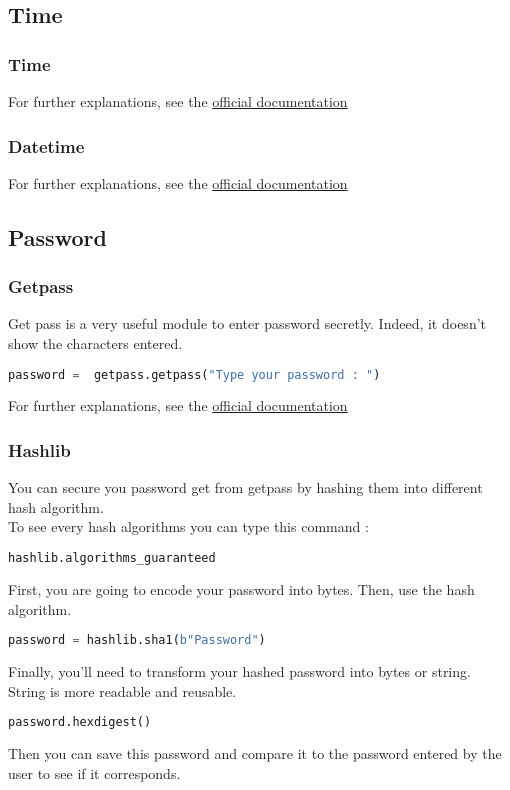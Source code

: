 \documentclass[a4paper, 12pt, titlepage]{scrartcl} %
\begin{document}
\subsection{Time}
\subsubsection{Time}
For further explanations, see the \href{https://docs.python.org/3/library/time.html}{official documentation}

\subsubsection{Datetime}
For further explanations, see the \href{https://docs.python.org/3/library/datetime.html}{official documentation}

\subsection{Password}
\subsubsection{Getpass}
Get pass is a very useful module to enter password secretly. Indeed, it doesn't show the characters entered.
\begin{lstlisting}[language=Python]
password =  getpass.getpass("Type your password : ")
\end{lstlisting} \vspace{5mm}

For further explanations, see the \href{https://docs.python.org/3/library/getpass.html}{official documentation}

\subsubsection{Hashlib}
You can secure you password get from getpass by hashing them into different hash algorithm.\\
To see every hash algorithms you can type this command : 
\begin{lstlisting}[language=Python]
hashlib.algorithms_guaranteed
\end{lstlisting} \vspace{5mm}
First, you are going to encode your password into bytes. Then, use the hash algorithm.
\begin{lstlisting}[language=Python]
password = hashlib.sha1(b"Password")
\end{lstlisting} \vspace{5mm}
Finally, you'll need to transform your hashed password into bytes or string. String is more readable and reusable.
\begin{lstlisting}[language=Python]
password.hexdigest()
\end{lstlisting} \vspace{5mm}
Then you can save this password and compare it to the password entered by the user to see if it corresponds.
\end{document}
